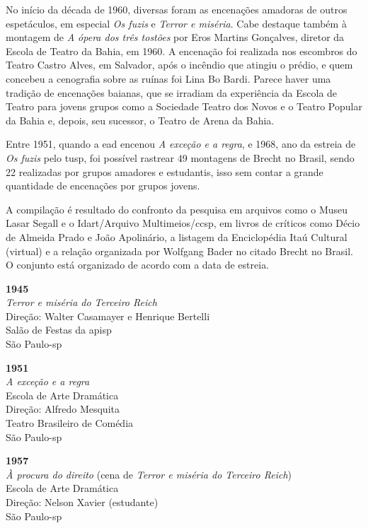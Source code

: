 No início da década de 1960, diversas foram as encenações amadoras de
outros espetáculos, em especial {\it Os fuzis} e {\it Terror e miséria}.
Cabe destaque também à montagem de {\it A ópera dos três tostões} por
Eros Martins Gonçalves, diretor da Escola de Teatro da Bahia, em 1960. A
encenação foi realizada nos escombros do Teatro Castro Alves, em
Salvador, após o incêndio que atingiu o prédio, e quem concebeu a
cenografia sobre as ruínas foi Lina Bo Bardi. Parece haver uma tradição
de encenações baianas, que se irradiam da experiência da Escola de
Teatro para jovens grupos como a Sociedade Teatro dos Novos e o Teatro
Popular da Bahia e, depois, seu sucessor, o Teatro de Arena da Bahia.

Entre 1951, quando a {\sc ead} encenou {\it A exceção e a regra}, e 1968, ano
da estreia de {\it Os fuzis} pelo {\sc tusp}, foi possível rastrear 49
montagens de Brecht no Brasil, sendo 22 realizadas por grupos amadores e
estudantis, isso sem contar a grande quantidade de encenações por grupos
jovens.

A compilação é resultado do confronto da pesquisa em arquivos como o
Museu Lasar Segall e o Idart/Arquivo Multimeios/{\sc ccsp}, em livros de
críticos como Décio de Almeida Prado e João Apolinário, a listagem da
Enciclopédia Itaú Cultural (virtual) e a relação organizada por Wolfgang
Bader no citado Brecht no Brasil. O conjunto está organizado de acordo
com a data de estreia.

\start[itemize]
\item{\bf 1945}\\
{\it Terror e miséria do Terceiro Reich}\\
Direção: Walter Casamayer e Henrique Bertelli\\
Salão de Festas da {\sc apisp}\\
São Paulo-{\sc sp}

\item{\bf 1951}\\
{\it A exceção e a regra}\\
Escola de Arte Dramática\\
Direção: Alfredo Mesquita\\
Teatro Brasileiro de Comédia\\
São Paulo-{\sc sp}

\item{\bf 1957}\\
{\it À procura do direito} (cena de {\it Terror e miséria do Terceiro
Reich})\\
Escola de Arte Dramática\\
Direção: Nelson Xavier (estudante)\\
São Paulo-{\sc sp}

